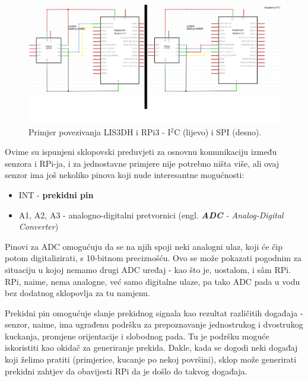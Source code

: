 \documentclass[12pt,a4paper]{article}
\begin{document}
		\begin{figure}[h!]
			\includegraphics[width=\linewidth]{slike/i2cSpiMergeNoLabel.png}
			\caption{Primjer povezivanja LIS3DH i RPi3 - I$^2$C (lijevo) i SPI (desno).}
			\label{fig:lis3dhRpi}
		\end{figure}

		\par Ovime su ispunjeni sklopovski preduvjeti za osnovnu komunikaciju između senzora i RPi-ja, i za jednostavne primjere nije potrebno ništa više, ali ovaj senzor ima još nekoliko pinova koji nude interesantne mogućnosti:
		\begin{itemize}
			\item INT - \textbf{prekidni pin}
			\item A1, A2, A3 - analogno-digitalni pretvornici (engl. \textit{\textbf{ADC} - Analog-Digital Converter}) \\
		\end{itemize}

		Pinovi za ADC omogućuju da se na njih spoji neki analogni ulaz, koji će čip potom digitalizirati, s 10-bitnom preciznošću. Ovo se može pokazati pogodnim za situaciju u kojoj nemamo drugi ADC uređaj - kao što je, uostalom, i sâm RPi. RPi, naime, nema analogne, već samo digitalne ulaze, pa tako ADC pada u vodu bez dodatnog sklopovlja za tu namjenu.

		\par Prekidni pin omogućuje slanje prekidnog signala kao rezultat različitih događaja - senzor, naime, ima ugrađenu podršku za prepoznavanje jednostrukog i dvostrukog kuckanja, promjene orijentacije i slobodnog pada. Tu je podršku moguće iskoristiti kao okidač za generiranje prekida. Dakle, kada se dogodi neki događaj koji želimo pratiti (primjerice, kucanje po nekoj površini), sklop može generirati prekidni zahtjev da obavijesti RPi da je došlo do takvog događaja.
\end{document}
